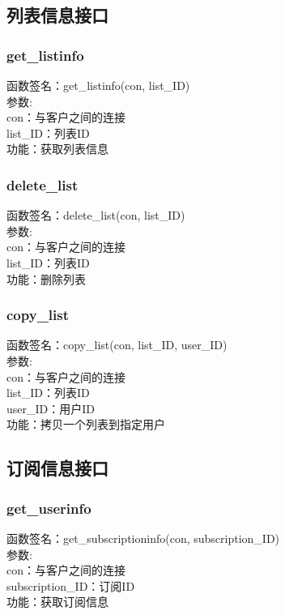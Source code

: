 \subsection{列表信息接口}

\subsubsection{get\_listinfo}
\noindent
函数签名：get\_listinfo(con, list\_ID)\\
参数:\\
con：与客户之间的连接\\
list\_ID：列表ID\\
功能：获取列表信息

\subsubsection{delete\_list}
\noindent
函数签名：delete\_list(con, list\_ID)\\
参数:\\
con：与客户之间的连接\\
list\_ID：列表ID\\
功能：删除列表

\subsubsection{copy\_list}
\noindent
函数签名：copy\_list(con, list\_ID, user\_ID)\\
参数:\\
con：与客户之间的连接\\
list\_ID：列表ID\\
user\_ID：用户ID\\
功能：拷贝一个列表到指定用户



\subsection{订阅信息接口}

\subsubsection{get\_userinfo}
\noindent
函数签名：get\_subscriptioninfo(con, subscription\_ID)\\
参数:\\
con：与客户之间的连接\\
subscription\_ID：订阅ID\\
功能：获取订阅信息


